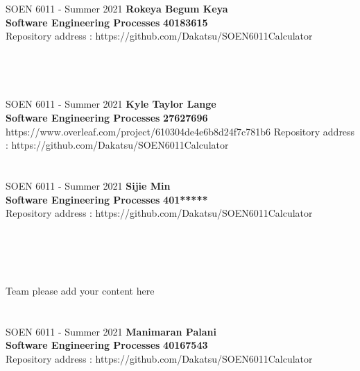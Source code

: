 \documentclass[a4paper, 11pt]{report}
\begin{document}
\section*{}
\normalsize {SOEN 6011 - Summer 2021} \hfill \textbf{Rokeya Begum Keya} \\
\textbf{ Software Engineering Processes}  \hfill \textbf{40183615} \\
\hfill Repository address : https://github.com/Dakatsu/SOEN6011Calculator
\\\\\\

\pagebreak

\section*{}
\normalsize {SOEN 6011 - Summer 2021} \hfill \textbf{Kyle Taylor Lange} \\
\textbf{ Software Engineering Processes}  \hfill \textbf{27627696} \\https://www.overleaf.com/project/610304de4e6b8d24f7c781b6
\hfill Repository address : https://github.com/Dakatsu/SOEN6011Calculator

\pagebreak

\section*{}
\normalsize {SOEN 6011 - Summer 2021} \hfill \textbf{Sijie Min} \\
\textbf{ Software Engineering Processes}  \hfill \textbf{401*****} \\
\hfill Repository address : https://github.com/Dakatsu/SOEN6011Calculator
\\\\\\\\\\
 \begin{center} Team please add your content here \end{center}
\pagebreak

\section*{}
\normalsize {SOEN 6011 - Summer 2021} \hfill \textbf{Manimaran Palani} \\
\textbf{ Software Engineering Processes}  \hfill \textbf{40167543} \\
\hfill Repository address : https://github.com/Dakatsu/SOEN6011Calculator
\\
\end{document}
